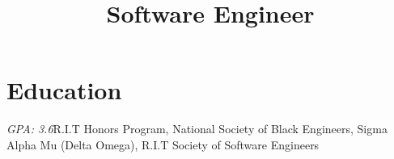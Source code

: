 \documentclass[11pt,a4paper,sans]{moderncv}        %
\title{Software Engineer}                               %
\begin{document}
\makecvtitle

\section{Education}
{\textit{GPA: 3.6}}{R.I.T Honors Program, National Society of Black Engineers, Sigma Alpha Mu (Delta Omega), R.I.T Society of Software Engineers}  %


\end{document}

